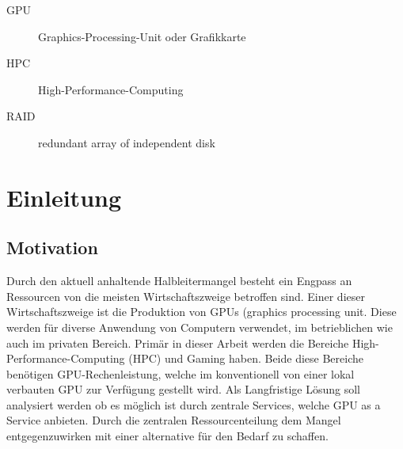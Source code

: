 \documentclass[12pt,toc=bib,toc=listof]{scrreprt}
\title{\topic}
\author{\studentnameA { ({\studentidA)}}, \\ \studentnameB { ({\studentidB)}}, \\ \studentnameC { ({\studentidC)}} }
\date {\semester}
\newcounter{savepage}
\begin{document}
\sffamily
\maketitle

\label{sec:management_summary}



\tableofcontents

\label{sec:abkuerzungsverzeichnis}

\begin{description}
\item[GPU] Graphics-Processing-Unit oder Grafikkarte
\item[HPC] High-Performance-Computing
\item[RAID] redundant array of independent disk
\end{description}


\listoffigures


\newpage

\chapter{Einleitung} %
\label{sec:einleitung}


\section{Motivation} %
\label{sec:motivation}
Durch den aktuell anhaltende Halbleitermangel besteht ein Engpass an Ressourcen von die meisten Wirtschaftszweige betroffen sind.
Einer dieser Wirtschaftszweige ist die Produktion von GPUs (graphics processing unit. Diese werden für diverse Anwendung von Computern verwendet, im betrieblichen wie auch im privaten Bereich.
Primär in dieser Arbeit werden die Bereiche High-Performance-Computing (HPC) und Gaming haben.
Beide diese Bereiche benötigen GPU-Rechenleistung, welche im konventionell von einer lokal verbauten GPU zur Verfügung gestellt wird. 
Als Langfristige Lösung soll analysiert werden ob es möglich ist durch zentrale Services, welche GPU as a Service anbieten. 
Durch die zentralen Ressourcenteilung dem Mangel entgegenzuwirken mit einer alternative für den Bedarf zu schaffen.
\end{document}
